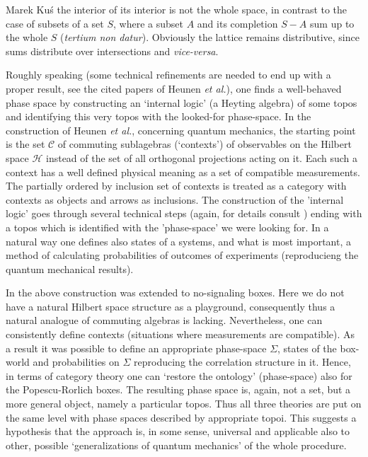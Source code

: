 \begin{artengenv}{Marek Ku\'s}
the interior of its interior is not the whole space, in contrast to the case of subsets of a set $S$, where a subset $A$ and its completion $S-A$ sum up to the whole $S$ (\textit{tertium non datur}). Obviously the lattice remains distributive, since sums distribute over intersections and \textit{vice-versa}.

Roughly speaking (some technical refinements are needed to end up with a proper result, see the cited papers of Heunen \textit{et al.}), one finds a well-behaved phase space by constructing an `internal logic' (a Heyting algebra) of some topos and identifying this very topos with the looked-for phase-space. In the construction of Heunen \textit{et al.}, concerning quantum mechanics, the starting point is the set $\mathscr{C}$ of commuting sublagebras (`contexts') of observables on the Hilbert space $\mathcal{H}$ instead of the set of all orthogonal projections acting on it. Each such a context has a well defined physical meaning as a set of compatible measurements. The partially ordered by inclusion set of contexts is treated as a category with contexts as objects and arrows as inclusions. The construction of the 'internal logic' goes through several technical steps (again, for details consult \parencite{heunen_topos_2009,heunen_gelfand_2011}) ending with a topos which is identified with the  'phase-space' we were looking for. In a natural way one defines also states of a systems, and what is most important, a method of calculating probabilities of outcomes of experiments (reproducieng the quantum mechanical results).

 In \parencite{gutt_non-signalling_2016} the above construction was extended to no-signaling boxes. Here we do not have a natural Hilbert space structure as a playground, consequently thus a natural analogue of commuting algebras is lacking. Nevertheless, one can consistently define contexts (situations where measurements are compatible). As a result it was possible to define an appropriate phase-space $\Sigma$, states of the box-world and probabilities on $\Sigma$ reproducing the correlation structure in it.  Hence, in terms of category theory one can `restore the ontology' (phase-space) also for the Popescu-Rorlich boxes. The resulting phase space is, again, not a set, but a more general object, namely a particular topos. Thus all three theories are put on the same level with phase spaces described by appropriate topoi. This suggests a hypothesis that the approach is, in some sense, universal and applicable also to other, possible `generalizations of quantum mechanics' of the whole procedure.
 

\end{artengenv}
